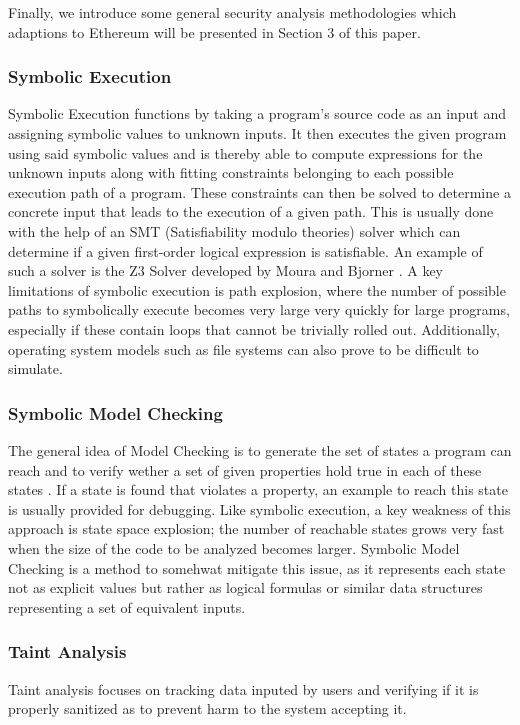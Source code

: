 \documentclass[letterpaper,twocolumn,10pt]{article}
\begin{document}
Finally, we introduce some general security analysis methodologies which adaptions to Ethereum will be presented in Section 3 of this paper. 

\subsubsection{Symbolic Execution}

Symbolic Execution functions by taking a program's source code as an input and assigning symbolic values to unknown inputs. It then executes the given program using said symbolic values and is thereby able to compute expressions for the unknown inputs along with fitting constraints belonging to each possible execution path of a program. These constraints can then be solved to determine a concrete input that leads to the execution of a given path. This is usually done with the help of an SMT (Satisfiability modulo theories) solver which can  determine if a given first-order logical expression is satisfiable. An example of such a solver is the Z3 Solver developed by Moura and Bjorner \cite{moura_bjorner_2008}. A key limitations of symbolic execution is path explosion, where the number of possible paths to symbolically execute becomes very large very quickly for large programs, especially if these contain loops that cannot be trivially rolled out. Additionally, operating system models such as file systems can also prove to be difficult to simulate.

\subsubsection{Symbolic Model Checking}
The general idea of Model Checking is to generate the set of states a program can reach and to verify wether a set of given properties hold true in each of these states \cite{osterland_rose_2020}. If a state is found that violates a property, an example to reach this state is usually provided for debugging. Like symbolic execution, a key weakness of this approach is state space explosion; the number of reachable states grows very fast when the size of the code to be analyzed becomes larger. Symbolic Model Checking is a method to somehwat mitigate this issue, as it represents each state not as explicit values but rather as logical formulas  or similar data structures representing a set of equivalent inputs.

\subsubsection{Taint Analysis}
Taint analysis focuses on tracking data inputed by users and verifying if it is properly sanitized as to prevent harm to the system accepting it.
\end{document}

